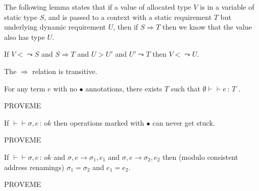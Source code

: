 \documentclass{article}
\newcommand{\safe}{\bullet}
\newcommand{\compatible}[2]{#1 \leadsto #2}
\newcommand{\comsubtype}[2]{#1 <\!\!\leadsto #2}
\newcommand{\implies}[2]{#1\Implies #2}
\newcommand{\Implies}[0]{\Rightarrow}
\newcommand{\red}[0]{\longrightarrow}  %
\newcommand{\lred}[0]{\red}  %
\newcommand{\judges}[3]{#1\vdash\!\!\!\vdash #2\,:\,#3}
\begin{document}
The following lemma states that if a value of allocated type $V$ is in a variable of static type $S$,
and is passed to a context with a static requirement $T$ but underlying dynamic requirement $U$,
then if $\implies S T$ then we know that the value also has type $U$.
 
\begin{lemma}
If $\comsubtype V {S}$ and $S\Implies T$ and $U > U'$ and $\compatible {U'} T$ then $\comsubtype V U$.
\end{lemma}

\begin{lemma}
The $\Implies$ relation is transitive. 
\end{lemma}


\begin{lemma}[No Failure]
For any term $e$ with no $\safe$ annotations, there exists $T$ such that
$\judges{\emptyset}{e}{T}$ .
\end{lemma}
PROVEME

\begin{lemma}[Soundness]
If $\judges{}{\sigma,e}{ok}$ then operations marked with $\safe$ can never get stuck.
\end{lemma}
PROVEME

\begin{lemma}[Determinism]
If $\judges{}{\sigma,e}{ok}$ and $\sigma,e\lred \sigma_1,e_1$ and $\sigma,e\lred \sigma_2,e_2$ then (modulo consistent address renamings) $\sigma_1=\sigma_2$ and $e_1=e_2$.
\end{lemma}
PROVEME
\end{document}
